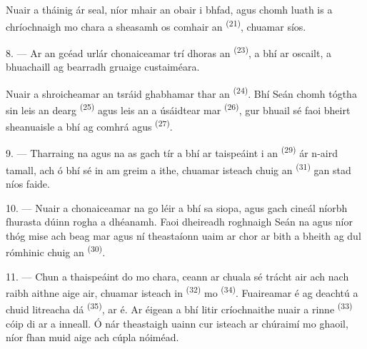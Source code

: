 Nuair a tháinig ár seal, níor mhair an obair i bhfad, agus chomh luath is a chríochnaigh
mo chara a sheasamh os comhair an  \textsuperscript{(21)}, chuamar
síos.

8. --- Ar an gcéad urlár chonaiceamar trí dhoras an 
\textsuperscript{(23)}, a bhí ar oscailt, a bhuachaill ag bearradh gruaige custaiméara.

Nuair a shroicheamar an tsráid ghabhamar thar an 
\textsuperscript{(24)}. Bhí Seán chomh tógtha sin leis an  dearg
\textsuperscript{(25)} agus leis an  a úsáidtear mar
 \textsuperscript{(26)}, gur bhuail sé faoi bheirt sheanuaisle a bhí
ag comhrá agus  \textsuperscript{(27)}.

\VUsaut{3.0mm}

9. --- Tharraing na  agus na  as gach tír a
bhí ar taispeáint i  an 
\textsuperscript{(29)} ár n-aird tamall, ach ó bhí sé in am greim a ithe, chuamar
isteach chuig an  \textsuperscript{(31)} gan stad níos faide.

10. --- Nuair a chonaiceamar na  go léir a bhí sa siopa,
 agus gach cineál  níorbh
fhurasta dúinn rogha a dhéanamh. Faoi dheireadh roghnaigh Seán na  agus níor thóg mise ach  beag  mar
 agus ní theastaíonn uaim ar chor ar bith
a bheith ag dul rómhinic chuig an  \textsuperscript{(30)}.

\VUsaut{3.0mm}

11. --- Chun  a thaispeáint do mo chara, ceann ar chuala sé trácht
air ach nach raibh aithne aige air, chuamar isteach in 
\textsuperscript{(32)} mo  \textsuperscript{(34)}. Fuaireamar é
ag deachtú a chuid litreacha dá  \textsuperscript{(35)}, ar
 é. Ar éigean a bhí litir críochnaithe nuair a rinne
 \textsuperscript{(33)} cóip di ar a inneall. Ó nár theastaigh
uainn cur isteach ar chúraimí mo ghaoil, níor fhan muid aige ach cúpla nóiméad.


